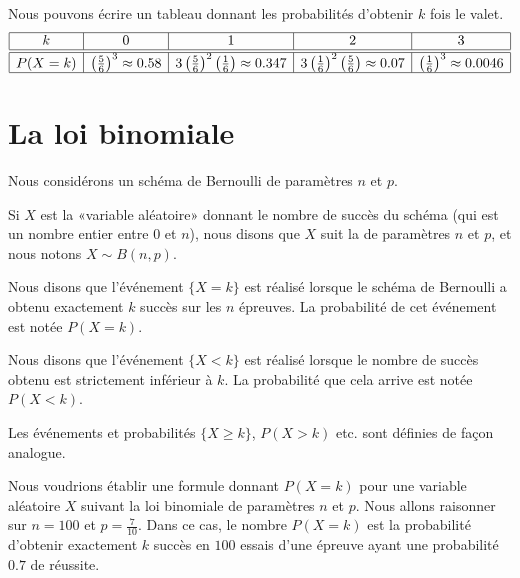 \begin{example}
    Nous pouvons écrire un tableau donnant les probabilités d'obtenir \( k\) fois le valet.
    \begin{equation}
        \begin{array}[]{|c|c|c|c|c|}
            \hline
            k&0&1&2&3\\
            \hline\hline
            P(X=k)&\left( \frac{ 5 }{ 6 } \right)^3\approx 0.58& 3\left( \frac{ 5 }{ 6 } \right)^2\left( \frac{1}{ 6 } \right)\approx 0.347 &3\left( \frac{1}{ 6 } \right)^2\left( \frac{ 5 }{ 6 } \right)\approx 0.07&\left( \frac{1}{ 6 } \right)^3\approx0.0046\\
            \hline
        \end{array}
    \end{equation}

\end{example}

\section{La loi binomiale}

Nous considérons un schéma de Bernoulli de paramètres \( n\) et \( p\).
\begin{Aretenir}
    Si \( X\) est la «variable aléatoire» donnant le nombre de succès du schéma (qui est un nombre entier entre \( 0\) et \( n\)), nous disons que \( X\) suit la  de paramètres \( n\) et \( p\), et nous notons \( X\sim B(n,p)\).

    Nous disons que l'événement \( \{ X=k \}\) est réalisé lorsque le schéma de Bernoulli a obtenu exactement \( k\) succès sur les \( n\) épreuves. La probabilité de cet événement est notée \( P(X=k)\).

    Nous disons que l'événement \( \{ X<k \}\) est réalisé lorsque le nombre de succès obtenu est strictement inférieur à \( k\). La probabilité que cela arrive est notée \( P(X<k)\).

    Les événements et probabilités \( \{ X\geq k \}\), \( P(X>k)\) etc. sont définies de façon analogue.
\end{Aretenir}


Nous voudrions établir une formule donnant \( P(X=k)\) pour une variable aléatoire \( X\) suivant la loi binomiale de paramètres \( n\) et \( p\). Nous allons raisonner sur \( n=100\) et \( p=\frac{ 7 }{ 10 }\). Dans ce cas, le nombre \( P(X=k)\) est la probabilité d'obtenir exactement \( k\) succès en \( 100\) essais d'une épreuve ayant une probabilité \( 0.7\) de réussite.

